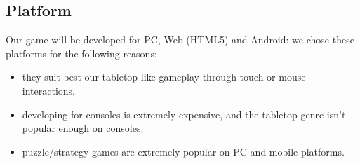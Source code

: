 \subsection{Platform}
Our game will be developed for PC, Web (HTML5) and Android: we chose these platforms for the following reasons:
\begin{itemize}
	\item they suit best our tabletop-like gameplay through touch or mouse interactions.
	\item developing for consoles is extremely expensive, and the tabletop genre isn't popular enough on consoles.
	\item puzzle/strategy games are extremely popular on PC and mobile platforms.
\end{itemize}
